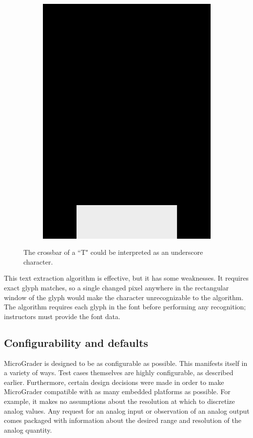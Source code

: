 \documentclass[12pt]{article}
\begin{document}
\begin{figure}[ht]
\begin{subfigure}[b]{.3\linewidth}
\includegraphics[width=\linewidth]{glyph-underscore.png}
\label{fig:glyph-underscore}
\end{subfigure}
\caption{The crossbar of a ``T" could be interpreted as an underscore character.}
\label{fig:bad-ocr}
\end{figure}

This text extraction algorithm is effective, but it has some weaknesses.  It requires exact glyph matches, so a single changed pixel anywhere in the rectangular window of the glyph would make the character unrecognizable to the algorithm.  The algorithm requires each glyph in the font before performing any recognition; instructors must provide the font data.

\subsection{Configurability and defaults}
\label{sec:config}
MicroGrader is designed to be as configurable as possible.  This manifests itself in a variety of ways.  Test cases themselves are highly configurable, as described earlier.  Furthermore, certain design decisions were made in order to make MicroGrader compatible with as many embedded platforms as possible.  For example, it makes no assumptions about the resolution at which to discretize analog values.  Any request for an analog input or observation of an analog output comes packaged with information about the desired range and resolution of the analog quantity.
\end{document}
